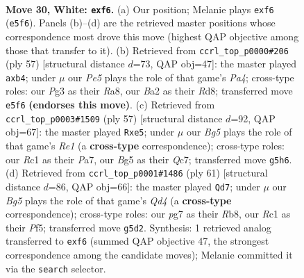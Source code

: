 \documentclass[11pt]{article}
\begin{document}
\clearpage

\begin{figure}[p]\centering
\begin{subfigure}{0.46\textwidth}\centering
\resizebox{\linewidth}{!}{%
\newchessgame
\chessboard[
  setfen={rn1r1k2/pp3qpQ/5p2/2P1P1B1/8/P5P1/BP3P2/2R1R1K1 w - - 3 30},
  showmover=false,
  pgfstyle=straightmove, color=movearrow, markmove={e5-f6}
]}
\caption{}
\end{subfigure}\hfill
\begin{subfigure}{0.46\textwidth}\centering
\resizebox{\linewidth}{!}{%
\newchessgame
\chessboard[
  setfen={r2r2k1/6pp/5p2/pqNbp3/1P5P/P5Q1/5PP1/1RR3K1 b - - 3 29},
  showmover=false,
  pgfstyle=straightmove, color=movearrow, markmove={a5-b4}
]}
\caption{}
\end{subfigure}
\\[4pt]
\begin{subfigure}{0.46\textwidth}\centering
\resizebox{\linewidth}{!}{%
\newchessgame
\chessboard[
  setfen={4rrk1/p1q5/1p5p/1b2Bp2/PPP3pP/3P4/7P/2RQR1K1 b - - 0 29},
  showmover=false,
  pgfstyle=straightmove, color=movearrow, markmove={e8-e5}
]}
\caption{}
\end{subfigure}\hfill
\begin{subfigure}{0.46\textwidth}\centering
\resizebox{\linewidth}{!}{%
\newchessgame
\chessboard[
  setfen={1r3r1k/p7/7b/3q1pNP/1ppP1P2/P7/1P4Q1/K2R2R1 b - - 1 31},
  showmover=false,
  pgfstyle=straightmove, color=movearrow, markmove={d5-d7}
]}
\caption{}
\end{subfigure}
\caption{\textbf{Move 30, White: \texttt{exf6}.} (a) Our position; Melanie plays \texttt{exf6} (\texttt{e5f6}). Panels (b)--(d) are the retrieved master positions whose correspondence most drove this move (highest QAP objective among those that transfer to it). (b) Retrieved from \texttt{ccrl\_top\_p0000\#206} (ply 57) [structural distance $d$=73, QAP obj=47]: the master played \texttt{axb4}; under $\mu$ our \emph{Pe5} plays the role of that game's \emph{Pa4}; cross-type roles: our \emph{P}g3 as their \emph{R}a8, our \emph{B}a2 as their \emph{R}d8; transferred move \texttt{e5f6} \textbf{(endorses this move)}. (c) Retrieved from \texttt{ccrl\_top\_p0003\#1509} (ply 57) [structural distance $d$=92, QAP obj=67]: the master played \texttt{Rxe5}; under $\mu$ our \emph{Bg5} plays the role of that game's \emph{Re1} (a \textbf{cross-type} correspondence); cross-type roles: our \emph{R}c1 as their \emph{P}a7, our \emph{B}g5 as their \emph{Q}c7; transferred move \texttt{g5h6}. (d) Retrieved from \texttt{ccrl\_top\_p0001\#1486} (ply 61) [structural distance $d$=86, QAP obj=66]: the master played \texttt{Qd7}; under $\mu$ our \emph{Bg5} plays the role of that game's \emph{Qd4} (a \textbf{cross-type} correspondence); cross-type roles: our \emph{p}g7 as their \emph{R}b8, our \emph{R}c1 as their \emph{P}f5; transferred move \texttt{g5d2}. Synthesis: 1 retrieved analog transferred to \texttt{exf6} (summed QAP objective 47, the strongest correspondence among the candidate moves); Melanie committed it via the \texttt{search} selector.}
\label{fig:thought-m58}
\end{figure}
\end{document}
